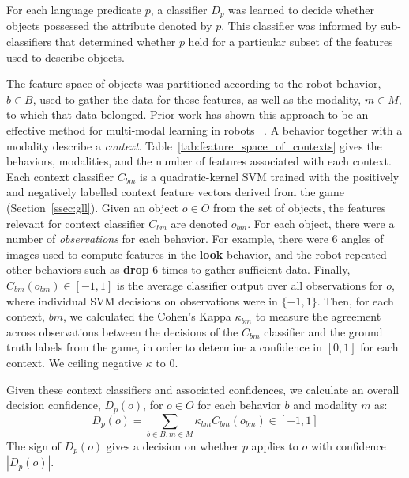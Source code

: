 For each language predicate $p$, a classifier $D_p$ was learned to decide
whether objects possessed the attribute denoted by $p$.  This classifier was
informed by sub-classifiers that determined whether $p$ held for a particular
subset of the features used to describe objects.

The feature space of objects was partitioned according to the robot behavior,
$b\in B$, used to gather the data for those features, as well as the modality,
$m\in M$, to which that data belonged.  Prior work has shown this approach to
be an effective method for multi-modal learning in robots
~\cite{sinapov:icra14}.  A behavior together with a modality describe a
\textit{context}.  Table~\ref{tab:feature_space_of_contexts} gives the
behaviors, modalities, and the number of features associated with each context.
Each context classifier $C_{bm}$ is a quadratic-kernel SVM trained with the
positively and negatively labelled context feature vectors derived from the
\ispy game (Section~\ref{ssec:gll}).  Given an object $o\in O$ from the set of
objects, the features relevant for context classifier $C_{bm}$ are denoted
$o_{bm}$.  For each object, there were a number of \textit{observations} for
each behavior.  For example, there were 6 angles of images used to compute
features in the \textbf{look} behavior, and the robot repeated other behaviors
such as \textbf{drop} 6 times to gather sufficient data.  Finally,
$C_{bm}(o_{bm})\in [-1,1]$ is the average classifier output over all
observations for $o$, where individual SVM decisions on observations were in
$\{-1,1\}$. Then, for each context, $bm$, we calculated the Cohen's Kappa
$\kappa_{bm}$ to measure the agreement across observations between the
decisions of the $C_{bm}$ classifier and the ground truth labels from the \ispy
game, in order to determine a confidence in $[0,1]$ for each context.  We
ceiling negative $\kappa$ to $0$.

Given these context classifiers and associated confidences, we calculate an
overall decision confidence, $D_p(o)$,
for $o\in O$ for each behavior $b$ and modality $m$ as:
\begin{equation}
	D_p(o) = \sum_{b\in B,m\in M}{\kappa_{bm} C_{bm}(o_{bm})} \in [-1,1]
\end{equation}
The sign of $D_p(o)$ gives a decision on whether $p$ applies to $o$ with
confidence $|D_p(o)|$.
